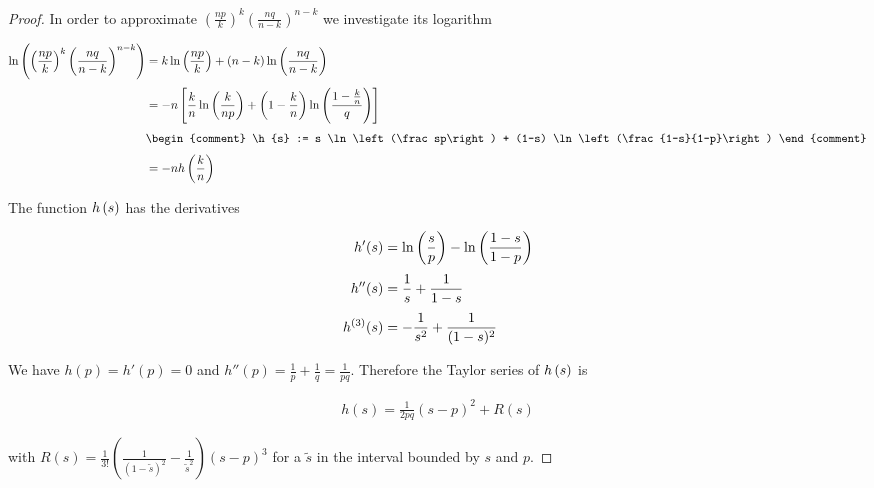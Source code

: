\begin{proof}
  \noindent In order to approximate $\left(\frac{np}{k}\right)^k \left(\frac{nq}{n-k}\right)^{n-k}$ we investigate its logarithm

  \begin{align}
    \ln\left(\left(\frac{np}{k}\right)^k \left(\frac{nq}{n-k}\right)^{n-k}\right) & = k \ln\left(\frac{np}{k}\right) + (n-k) \ln\left(\frac{nq}{n-k}\right) \nl
    &=-n \left[ \frac kn \ln\left(\frac{k}{np}\right) + \left(1-\frac kn\right) \ln\left(\frac{1-\frac kn}{q}\right)\right] \nl
    &
    \begin{comment}
      \h{s} := s \ln\left(\frac sp\right) + (1-s) \ln\left(\frac{1-s}{1-p}\right)
    \end{comment} \nl
    &=-n \h{\frac kn}
  \end{align}

  \noindent The function $h\left({s}\right)$ has the derivatives

  \begin{align}
    h'(s) &= \ln\left(\frac sp\right) - \ln\left(\frac{1-s}{1-p}\right) \nl
    h''(s) &= \frac 1s + \frac 1{1-s} \nl
    h^{(3)}(s) &= -\frac 1{s^2} + \frac 1{(1-s)^2}
  \end{align}

  \noindent We have $h(p)=h'(p)=0$ and $h''(p) = \frac 1p + \frac 1q = \frac 1{pq}$. Therefore the Taylor series of $h\left({s}\right)$ is

  \begin{align}
    h(s) = \frac{1}{2pq} (s-p)^2 + R(s)
  \end{align}

  \noindent with $R(s)=\frac{1}{3!} \left(\frac{1}{(1-\tilde s)^2}-\frac{1}{\tilde s^2}\right) (s-p)^3$ for a $\tilde s$ in the interval bounded by $s$ and $p$. 
\end{proof}
